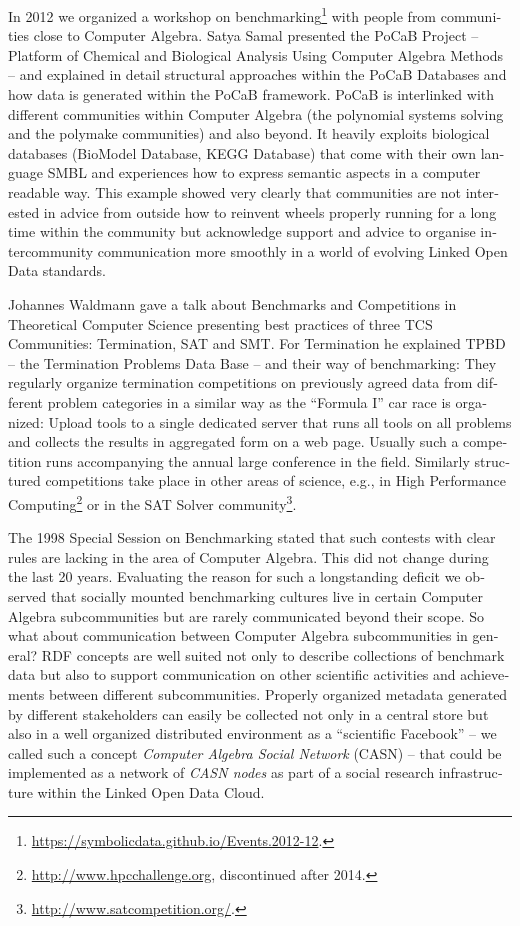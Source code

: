 \documentclass[11pt]{article}
\begin{document}
\begin{otherlanguage}{english}
\begin{multicols}{2}
In 2012 we organized a workshop on
benchmarking\footnote{\url{https://symbolicdata.github.io/Events.2012-12}.}
with people from communities close to Computer Algebra.  Satya Samal presented
the PoCaB Project -- Platform of Chemical and Biological Analysis Using
Computer Algebra Methods -- and explained in detail structural approaches
within the PoCaB Databases and how data is generated within the PoCaB
framework.  PoCaB is interlinked with different communities within Computer
Algebra (the polynomial systems solving and the polymake communities) and also
beyond. It heavily exploits biological databases (BioModel Database, KEGG
Database) that come with their own language SMBL and experiences how to
express semantic aspects in a computer readable way. This example showed very
clearly that communities are not interested in advice from outside how to
reinvent wheels properly running for a long time within the community but
acknowledge support and advice to organise intercommunity communication more
smoothly in a world of evolving Linked Open Data standards.

Johannes Waldmann gave a talk about Benchmarks and Competitions in Theoretical
Computer Science presenting best practices of three TCS Communities:
Termination, SAT and SMT. For Termination he explained TPBD -- the Termination
Problems Data Base -- and their way of benchmarking: They regularly organize
termination competitions on previously agreed data from different problem
categories in a similar way as the “Formula I” car race is organized: Upload
tools to a single dedicated server that runs all tools on all problems and
collects the results in aggregated form on a web page. Usually such a
competition runs accompanying the annual large conference in the field.
Similarly structured competitions take place in other areas of science, e.g.,
in High Performance Computing\footnote{\url{http://www.hpcchallenge.org},
  discontinued after 2014.} or in the SAT Solver
community\footnote{\url{http://www.satcompetition.org/}.}.

The 1998 Special Session on Benchmarking stated that such contests with clear
rules are lacking in the area of Computer Algebra. This did not change during
the last 20 years.  Evaluating the reason for such a longstanding deficit we
observed that socially mounted benchmarking cultures live in certain Computer
Algebra subcommunities but are rarely communicated beyond their scope. So
what about communication between Computer Algebra subcommunities in general?
RDF concepts are well suited not only to describe collections of benchmark data
but also to support communication on other scientific activities and
achievements between different subcommunities.  Properly organized metadata
generated by different stakeholders can easily be collected not only in a
central store but also in a well organized distributed environment as a
``scientific Facebook'' -- we called such a concept \emph{Computer Algebra
  Social Network} (CASN) \cite{cicm-14} -- that could be implemented as a
network of \emph{CASN nodes} as part of a social research infrastructure within
the Linked Open Data Cloud.


\end{multicols}
\end{otherlanguage}
\end{document}
